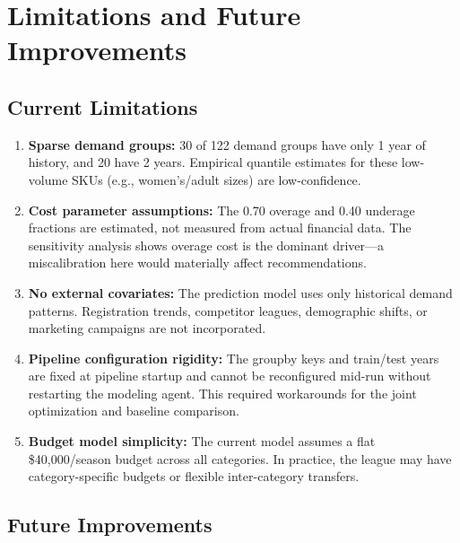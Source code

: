 \documentclass[11pt, letterpaper]{article}
\begin{document}
\section{Limitations and Future Improvements}

\subsection{Current Limitations}

\begin{enumerate}
    \item \textbf{Sparse demand groups:} 30 of 122 demand groups have only 1 year of history, and 20 have 2 years. Empirical quantile estimates for these low-volume SKUs (e.g., women's/adult sizes) are low-confidence.

    \item \textbf{Cost parameter assumptions:} The 0.70 overage and 0.40 underage fractions are estimated, not measured from actual financial data. The sensitivity analysis shows overage cost is the dominant driver---a miscalibration here would materially affect recommendations.

    \item \textbf{No external covariates:} The prediction model uses only historical demand patterns. Registration trends, competitor leagues, demographic shifts, or marketing campaigns are not incorporated.

    \item \textbf{Pipeline configuration rigidity:} The groupby keys and train/test years are fixed at pipeline startup and cannot be reconfigured mid-run without restarting the modeling agent. This required workarounds for the joint optimization and baseline comparison.

    \item \textbf{Budget model simplicity:} The current model assumes a flat \$40,000/season budget across all categories. In practice, the league may have category-specific budgets or flexible inter-category transfers.
\end{enumerate}

\subsection{Future Improvements}
\end{document}
